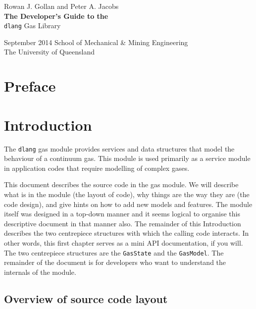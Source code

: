 \documentclass[a4paper,11pt,twoside,onecolumn]{memoir}
\newcommand{\dlang}{\texttt{dlang}\xspace}
\newcommand{\type}[1]{\texttt{#1}}
\begin{document}
\frontmatter

\begin{titlingpage}
\raggedleft
\vspace*{\baselineskip}
{\Large\sffamily Rowan J. Gollan and Peter A. Jacobs}\\[0.2\textheight]
{\bfseries\sffamily The Developer's Guide to the}\\[\baselineskip]
{\Huge\sffamily \texttt{dlang} Gas Library}\par
\vspace*{0.1\textheight}
{\Large\sffamily September 2014}
\vfill
\centering
{\large School of Mechanical \& Mining Engineering\\The University of Queensland}
\end{titlingpage}

\chapter{Preface}

\tableofcontents

\mainmatter

\chapter{Introduction}

The \dlang gas module provides services and data structures that model
the behaviour of a continuum gas.
This module is used primarily as a service module in application codes that require
modelling of complex gases.

This document describes the source code in the gas module.
We will describe what is in the module (the layout of code),
why things are the way they are (the code design), 
and give hints on how to add new models and features.
The module itself was designed in a top-down manner and
it seems logical to organise this descriptive document
in that manner also.
The remainder of this Introduction describes the two
centrepiece structures with which the calling code interacts.
In other words, this first chapter serves as a mini API documentation,
if you will.
The two centrepiece structures are the \type{GasState}  
and the \type{GasModel}.
The remainder of the document is for developers who want
to understand the internals of the module.

\section{Overview of source code layout}
\end{document}
